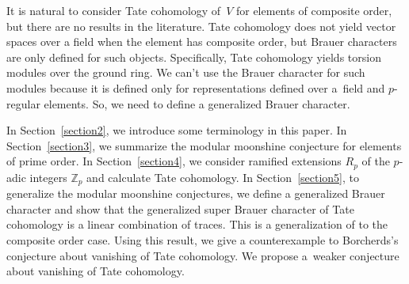 It is natural to consider Tate cohomology of~$V$ for elements of composite order, but there are no results in the literature. Tate cohomology does not yield vector spaces over a field when the element has composite order, but Brauer characters are only defined for such objects. Specifically, Tate cohomology yields torsion modules over the ground ring. We can't use the Brauer character for such modules because it is defined only for representations defined over a~field and $p$-regular elements. So, we need to define a generalized Brauer character.

In Section~\ref{section2}, we introduce some terminology in this paper. In Section~\ref{section3}, we summarize the modular moonshine conjecture for elements of prime order. In Section~\ref{section4}, we consider ramified extensions $R_p$ of the $p$-adic integers $\mathbb{Z}_p$ and calculate Tate cohomology. In Section~\ref{section5}, to generalize the modular moonshine conjectures, we define a generalized Brauer character and show that the generalized super Brauer character of Tate cohomology is a linear combination of traces. This is a generalization of \cite[Proposition~2.2]{BR} to the composite order case. Using this result, we give a counterexample to Borcherds's conjecture about vanishing of Tate cohomology. We propose a~weaker conjecture about vanishing of Tate cohomology.
